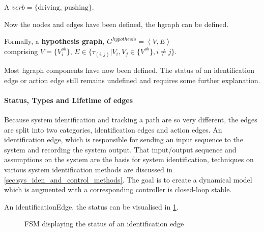 A $verb = \{\textrm{driving, pushing}\}$.\bs

Now the nodes and edges have been defined, the \ac{hgraph} can be defined.\bs

Formally, a \textbf{hypothesis graph}, $G^{hypothesis} = \left\langle V, E \right\rangle $ 
\\comprising $V = \{V^{ob}_{i}\}$, \quad $E \in \{\tau_{(i,j)}| V_i, V_j \in \{V^{ob} \}, i \neq j\}$.\bs

Most \ac{hgraph} components have now been defined. The status of an identification edge or action edge still remains undefined and requires some further explanation.\bs

\paragraph{Status, Types and Lifetime of edges}
Because system identification and tracking a path are so very different, the edges are split into two categories, identification edges and action edges. An identification edge, which is responsible for sending an input sequence to the system and recording the system output. That input/output sequence and assumptions on the system are the basis for system identification, techniques on various system identification methods are discussed in \cref{sec:sys_iden_and_control_methods}. The goal is to create a dynamical model which is augmented with a corresponding controller is closed-loop stable.\bs

An identificationEdge, the status can be visualised in \cref{tikz:status_identification_edge}.\bs

\begin{figure}[H]
\centering
{}
\caption{\acs{FSM} displaying the status of an identification edge}%
\label{tikz:status_identification_edge}
\end{figure}

